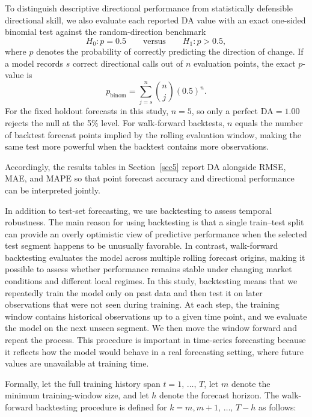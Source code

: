 \documentclass[pdflatex,sn-mathphys-num]{sn-jnl}%
\theoremstyle{thmstyleone}%
\theoremstyle{thmstyletwo}%
\theoremstyle{thmstylethree}%
\begin{document}
To distinguish descriptive directional performance from statistically defensible directional skill, we also evaluate each reported DA value with an exact one-sided binomial test against the random-direction benchmark
\begin{equation}
H_0: p = 0.5 \qquad \text{versus} \qquad H_1: p > 0.5,
\label{eq:da_hypothesis}
\end{equation}
where $p$ denotes the probability of correctly predicting the direction of change. If a model records $s$ correct directional calls out of $n$ evaluation points, the exact $p$-value is
\begin{equation}
p_{\text{binom}} = \sum_{j=s}^{n} \binom{n}{j} (0.5)^n.
\label{eq:da_binom}
\end{equation}
For the fixed holdout forecasts in this study, $n=5$, so only a perfect $\mathrm{DA}=1.00$ rejects the null at the 5\% level. For walk-forward backtests, $n$ equals the number of backtest forecast points implied by the rolling evaluation window, making the same test more powerful when the backtest contains more observations.

Accordingly, the results tables in Section~\ref{sec5} report DA alongside RMSE, MAE, and MAPE so that point forecast accuracy and directional performance can be interpreted jointly.

In addition to test-set forecasting, we use backtesting to assess temporal robustness. The main reason for using backtesting is that a single train--test split can provide an overly optimistic view of predictive performance when the selected test segment happens to be unusually favorable. In contrast, walk-forward backtesting evaluates the model across multiple rolling forecast origins, making it possible to assess whether performance remains stable under changing market conditions and different local regimes. In this study, backtesting means that we repeatedly train the model only on past data and then test it on later observations that were not seen during training. At each step, the training window contains historical observations up to a given time point, and we evaluate the model on the next unseen segment. We then move the window forward and repeat the process. This procedure is important in time-series forecasting because it reflects how the model would behave in a real forecasting setting, where future values are unavailable at training time.

Formally, let the full training history span $t = 1, \, \ldots, \, T$, let $m$ denote the minimum training-window size, and let $h$ denote the forecast horizon. The walk-forward backtesting procedure is defined for $k = m, m+1, \, \ldots, \, T-h$ as follows:
\end{document}
